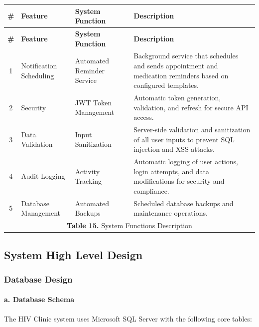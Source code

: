 \documentclass[12pt,a4paper]{article}
\begin{document}
\renewcommand{\arraystretch}{1.5}
\begin{longtable}{|c|p{4.5cm}|p{4.5cm}|p{6.5cm}|}
\hline
\textbf{\#} & \textbf{Feature} & \textbf{System Function} & \textbf{Description} \\
\hline
\endfirsthead

\hline
\textbf{\#} & \textbf{Feature} & \textbf{System Function} & \textbf{Description} \\
\hline
\endhead

1 & Notification Scheduling & Automated Reminder Service & Background service that schedules and sends appointment and medication reminders based on configured templates. \\
\hline
2 & Security & JWT Token Management & Automatic token generation, validation, and refresh for secure API access. \\
\hline
3 & Data Validation & Input Sanitization & Server-side validation and sanitization of all user inputs to prevent SQL injection and XSS attacks. \\
\hline
4 & Audit Logging & Activity Tracking & Automatic logging of user actions, login attempts, and data modifications for security and compliance. \\
\hline
5 & Database Management & Automated Backups & Scheduled database backups and maintenance operations. \\
\hline
\multicolumn{4}{|c|}{\textbf{Table 15.} System Functions Description} \\
\hline
\end{longtable}


\subsection{System High Level Design}

\subsubsection{Database Design}

\paragraph{a. Database Schema}

The HIV Clinic system uses Microsoft SQL Server with the following core tables:
\end{document}
